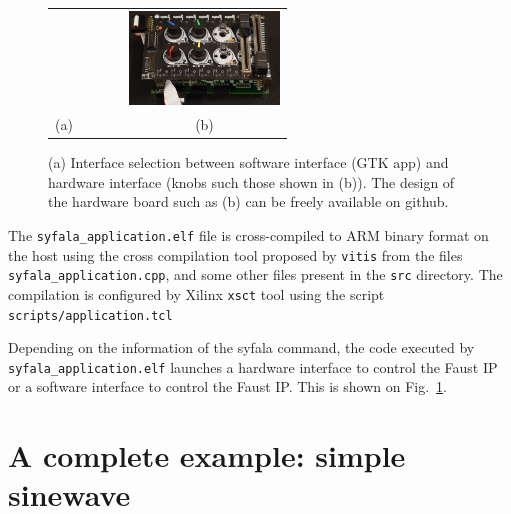 \documentclass[11pt]{article}
\numberwithin{equation}{section}
\numberwithin{figure}{section}
\begin{document}
\begin{figure}[ht]
\centering
  \begin{tabular}{ccc}
    &~~~~ &
    \includegraphics[width=4cm]{fig/popophone.jpg}\\
    (a) & &(b)
    \end{tabular}
\caption{(a) Interface selection between software interface (GTK app) and hardware interface (knobs such those shown in (b)). The design of the hardware board such as (b) can be freely available on github.}
\label{fig:interfaceOverview}
\end{figure}
  The {\tt syfala\_application.elf} file is cross-compiled to ARM binary format on the host using the cross compilation tool proposed by {\tt vitis} from the files {\tt syfala\_application.cpp}, and some other files present in the {\tt src} directory. The compilation is configured by Xilinx {\tt xsct} tool using the script {\tt scripts/application.tcl}

Depending on the information of the syfala command, the code executed by {\tt syfala\_application.elf} launches a hardware interface to control the Faust IP or a software interface to control the Faust IP. This is shown on Fig.~\ref{fig:interfaceOverview}.


\section{A complete example: simple sinewave}






\newpage
\appendix
\label{Annex1}



%
\end{document}
